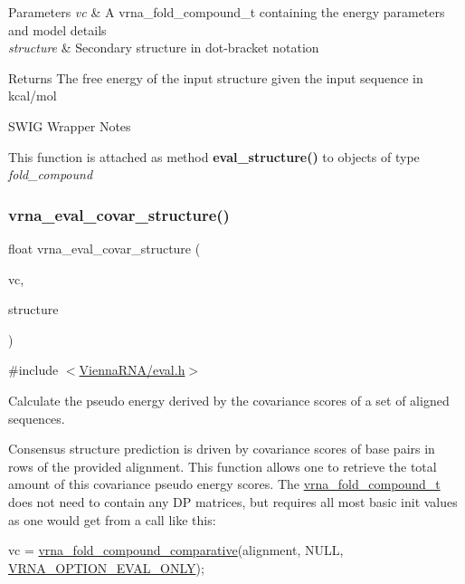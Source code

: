 \begin{DoxyParams}{Parameters}
{\em vc} & A vrna\+\_\+fold\+\_\+compound\+\_\+t containing the energy parameters and model details \\
\hline
{\em structure} & Secondary structure in dot-\/bracket notation \\
\hline
\end{DoxyParams}
\begin{DoxyReturn}{Returns}
The free energy of the input structure given the input sequence in kcal/mol
\end{DoxyReturn}
\begin{DoxyRefDesc}{S\+W\+I\+G Wrapper Notes}
\item[\mbox{\hyperlink{wrappers__wrappers000025}{S\+W\+I\+G Wrapper Notes}}]This function is attached as method {\bfseries eval\+\_\+structure()} to objects of type {\itshape fold\+\_\+compound} \end{DoxyRefDesc}
\mbox{\label{group__eval_ga6cea75c0eb9857fb59172be54cab09e0}} 
\subsubsection{\texorpdfstring{vrna\+\_\+eval\+\_\+covar\+\_\+structure()}{vrna\_eval\_covar\_structure()}}
{\footnotesize\ttfamily float vrna\+\_\+eval\+\_\+covar\+\_\+structure (\begin{DoxyParamCaption}\item[{\mbox{\hyperlink{group__fold__compound_ga1b0cef17fd40466cef5968eaeeff6166}{vrna\+\_\+fold\+\_\+compound\+\_\+t}} $\ast$}]{vc,  }\item[{const char $\ast$}]{structure }\end{DoxyParamCaption})}



{\ttfamily \#include $<$\mbox{\hyperlink{eval_8h}{Vienna\+R\+N\+A/eval.\+h}}$>$}



Calculate the pseudo energy derived by the covariance scores of a set of aligned sequences. 

Consensus structure prediction is driven by covariance scores of base pairs in rows of the provided alignment. This function allows one to retrieve the total amount of this covariance pseudo energy scores. The \mbox{\hyperlink{group__fold__compound_ga1b0cef17fd40466cef5968eaeeff6166}{vrna\+\_\+fold\+\_\+compound\+\_\+t}} does not need to contain any DP matrices, but requires all most basic init values as one would get from a call like this\+: 
\begin{DoxyCode}
vc = \mbox{\hyperlink{group__fold__compound_gad6bacc816af274922b13d947f708aa0c}{vrna\_fold\_compound\_comparative}}(alignment, NULL, 
      \mbox{\hyperlink{group__fold__compound_ga61469c423131552c8483229f8b6c7e0e}{VRNA\_OPTION\_EVAL\_ONLY}});
\end{DoxyCode}


